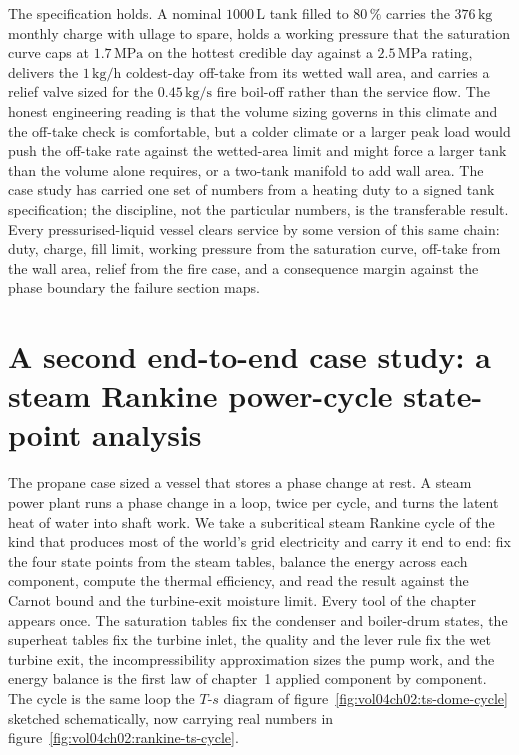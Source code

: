 The specification holds. A nominal $1000\,\text{L}$ tank filled to
$80\,\%$ carries the $376\,\text{kg}$ monthly charge with ullage to
spare, holds a working pressure that the saturation curve caps at
$1.7\,\text{MPa}$ on the hottest credible day against a $2.5\,\text{MPa}$
rating, delivers the $1\,\text{kg}/\text{h}$ coldest-day off-take from
its wetted wall area, and carries a relief valve sized for the
$0.45\,\text{kg}/\text{s}$ fire boil-off rather than the service flow.
The honest engineering reading is that the volume sizing governs in this
climate and the off-take check is comfortable, but a colder climate or a
larger peak load would push the off-take rate against the wetted-area
limit and might force a larger tank than the volume alone requires, or a
two-tank manifold to add wall area. The case study has carried one set of
numbers from a heating duty to a signed tank specification; the
discipline, not the particular numbers, is the transferable result. Every
pressurised-liquid vessel clears service by some version of this same
chain: duty, charge, fill limit, working pressure from the saturation
curve, off-take from the wall area, relief from the fire case, and a
consequence margin against the phase boundary the failure section maps.

\section{A second end-to-end case study: a steam Rankine
power-cycle state-point analysis}

The propane case sized a vessel that stores a phase change at rest. A
steam power plant runs a phase change in a loop, twice per cycle, and
turns the latent heat of water into shaft work. We take a subcritical
steam Rankine cycle of the kind that produces most of the world's
grid electricity and carry it end to end: fix the four state points from
the steam tables, balance the energy across each component, compute the
thermal efficiency, and read the result against the Carnot bound and the
turbine-exit moisture limit. Every tool of the chapter appears once. The
saturation tables fix the condenser and boiler-drum states, the
superheat tables fix the turbine inlet, the quality and the lever rule
fix the wet turbine exit, the incompressibility approximation sizes the
pump work, and the energy balance is the first law of chapter~1 applied
component by component. The cycle is the same loop the $T$-$s$ diagram of
figure~\ref{fig:vol04ch02:ts-dome-cycle} sketched schematically, now
carrying real numbers in figure~\ref{fig:vol04ch02:rankine-ts-cycle}.

